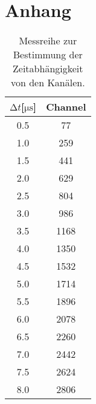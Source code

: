 \newpage
\section{Anhang}
\begin{table}
    \centering
    \caption{Messreihe zur Bestimmung der Zeitabhängigkeit von den Kanälen.} 
    \label{tab:1122332211}
    \begin{tabular}{c c}
        \toprule
        $\increment t$[$\si{\micro\second}$] & Channel \\
        \midrule
        0.5   &  77\\
        1.0     &  259\\ 
        1.5   &  441\\
        2.0     &  629\\
        2.5   &  804\\
        3.0     &  986\\
        3.5   &  1168\\
        4.0     &  1350\\
        4.5   &  1532\\
        5.0     &  1714\\
        5.5   &  1896\\
        6.0     &  2078\\
        6.5   &  2260\\
        7.0     &  2442\\
        7.5   &  2624\\
        8.0     &  2806\\
    \end{tabular}
\end{table}





